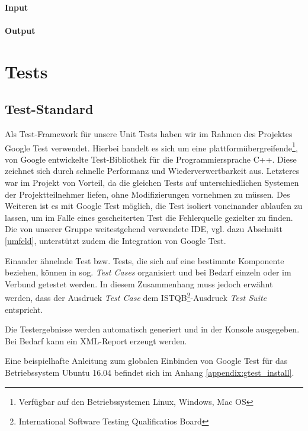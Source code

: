 \documentclass[a4paper, 12pt, titlepage]{scrartcl}
\begin{document}
				\paragraph{Input}
				\paragraph{Output}			
				
	\section{Tests}
	\label{tests}
		\subsection{Test-Standard}
		\label{test_standard}
		Als Test-Framework für unsere Unit Tests haben wir im Rahmen des Projektes Google Test verwendet.
		Hierbei handelt es sich um eine plattformübergreifende\footnote{Verfügbar auf den Betriebssystemen Linux, Windows, Mac OS},
		von Google entwickelte Test-Bibliothek für die Programmiersprache C++. Diese zeichnet sich durch schnelle Performanz und 
		Wiederverwertbarkeit aus. Letzteres war im Projekt von Vorteil, da die gleichen Tests auf unterschiedlichen Systemen der 
		Projektteilnehmer liefen, ohne Modifizierungen vornehmen zu müssen. Des Weiteren ist es mit Google Test möglich, die Test 
		isoliert voneinander ablaufen zu lassen, um im Falle eines gescheiterten Test die Fehlerquelle gezielter zu finden. Die von unserer Gruppe weitestgehend verwendete IDE, vgl. dazu Abschnitt \ref{umfeld}, unterstützt zudem die Integration von Google Test. 
		
		Einander ähnelnde Test bzw. Tests, die sich auf eine bestimmte Komponente beziehen, können in sog. \emph{Test Cases} 
		organisiert und bei Bedarf einzeln oder im Verbund getestet werden. In diesem Zusammenhang muss jedoch erwähnt werden, 
		dass der Ausdruck \emph{Test Case} dem ISTQB\footnote{International Software Testing Qualificatios Board}-Ausdruck 
		\emph{Test Suite} entspricht\cite{google}. 
		
		Die Testergebnisse werden automatisch generiert und in der Konsole ausgegeben. Bei Bedarf kann ein XML-Report erzeugt werden. 
		
		Eine beispielhafte Anleitung zum globalen Einbinden von Google Test für das Betriebssystem Ubuntu 16.04 befindet sich im Anhang \ref{appendix:gtest_install}. 
		
		
\end{document}
